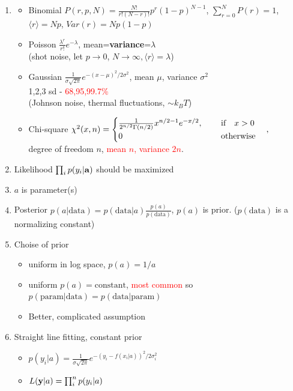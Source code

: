 \documentclass{article}
\theoremstyle{remark}
\theoremstyle{remark}
\begin{document}
\begin{enumerate}
    \item \begin{itemize}
        \item Binomial $P(r,p,N) = \frac{N!}{r!(N-r)!}p^r(1-p)^{N-1}$, $\sum_{r=0}^N P(r)=1$, $\langle r\rangle=Np$, $Var(r)=Np(1-p)$
        \item Poisson $\frac{\lambda^r}{r!}e^{-\lambda}$, mean=\textbf{variance}=$\lambda$\\(shot noise, let $p\rightarrow 0$, $N\rightarrow\infty, \langle r\rangle=\lambda$)
        \item Gaussian $\frac{1}{\sigma\sqrt{2\pi}}e^{-(x-\mu)^2/2\sigma^2}$, mean $\mu$, variance $\sigma^2$\\
            1,2,3 sd - \textcolor{red}{68,95,99.7\%}\\
            (Johnson noise, thermal fluctuations, $\sim k_B T$)
        \item Chi-square $\chi^2(x,n)=\begin{cases}
                \frac{1}{2^{n/2}\Gamma(n/2)}x^{n/2-1}e^{-x/2},&\ \qif x>0\\
                0&\ \qotherwise
            \end{cases},$\\ degree of freedom $n$, \textcolor{red}{mean $n$, variance $2n$}.
    \end{itemize}
    \item Likelihood $\prod_i p(y_i|\vb{a})$ should be maximized
    \item $a$ is parameter(s)
    \item Posterior $p(a|\text{data})=p(\text{data}|a)\frac{p(a)}{p(\text{data})}$, $p(a)$ is prior. ($p(\text{data})$ is a normalizing constant)
    \item Choise of prior\begin{itemize}
            \item uniform in log space, $p(a)=1/a$
            \item uniform $p(a)=\text{constant}$, \textcolor{red}{most common} so $p(\text{param}|\text{data})=p(\text{data}|\text{param})$
            \item Better, complicated assumption
        \end{itemize}
    \item Straight line fitting, constant prior\begin{itemize}
            \item $p(y_i|a)=\frac{1}{\sigma\sqrt{2\pi}}e^{-(y_i-f(x_i|a))^2/2\sigma_i^2}$
            \item $L(\vb{y}|a)=\prod_i^n p(y_i|a)$

\end{itemize}
\end{enumerate}
\end{document}
